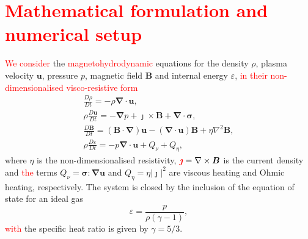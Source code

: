 \documentclass[12pt]{article}
\newcommand{\rs}[2]{\textcolor{red}{#2}}
\newcommand{\ten}[1]{{\bm #1}}
\renewcommand{\vec}[1]{{\bm #1}}
\begin{document}
\section{\rs{Numerical setup}{Mathematical formulation and numerical setup}}
\label{sec-numerical-setup}

\rs{Lare3d numerically solves}{We consider} the
\rs{MHD}{magnetohydrodynamic} equations for the density $\rho$, plasma
velocity $\vec{u}$, pressure $p$, magnetic field $\vec{B}$ and
internal energy $\varepsilon$, \rs{}{in their non-dimensionalised
  visco-resistive form}
\begin{subequations}
  \label{eq:MHD}
  \begin{gather}
\label{eq:mhda}
\frac{D\rho}{Dt} = - \rho \vec{\nabla} \cdot \vec{u},\\
\rho\frac{D\vec{u}}{Dt} = -\vec{\nabla} p + \vec{\jmath} \times \vec{B} + \vec{\nabla} \cdot \ten{\sigma},\\
\frac{D\vec{B}}{Dt} = (\vec{B} \cdot \vec{\nabla})\vec{u} - (\vec{\nabla} \cdot \vec{u})\vec{B} + \eta \nabla^2 \vec{B},\\
\rho\frac{D\varepsilon}{Dt} = -p \vec{\nabla} \cdot \vec{u} + {Q}_{\nu} + {Q}_{\eta},%
    \end{gather}
\end{subequations}
where $\eta$ is the non-dimensionalised resistivity,
$\rs{\jmath}{\vec{\jmath}} = \nabla \times \vec{B}$ is the current
density and \rs{$\ten{\sigma}$ is the viscous stress tensor (described
  below). The}{the} terms ${Q}_{\nu} = \ten{\sigma} : \vec{\nabla}\vec{u}$
  and ${Q}_{\eta} = \eta | \vec{\jmath} |^2$ are viscous heating and
  Ohmic heating, respectively. The system is closed by the inclusion
  of the equation of state for an ideal gas 
\begin{equation}
\varepsilon = \frac{p}{\rho(\gamma - 1)},
\end{equation}
\rs{where}{with} the specific heat ratio is given by $\gamma = 5/3$.
\end{document}
